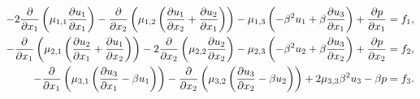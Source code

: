 \begin{align}
  - 2\frac{\partial}{\partial x_1}%
  \parent{\mu_{1,1}\frac{\partial u_1}{\partial x_1}} %
  -  \frac{\partial}{\partial x_2}%
  \parent{\mu_{1,2}\parent{\frac{\partial u_1}{\partial x_2} %
                           + \frac{\partial u_2}{\partial x_1}}} %
  - \mu_{1,3}\parent{- \beta^2 u_1 %
                     + \beta\frac{\partial u_3}{\partial x_1}} %
  + \frac{\partial p}{\partial x_1} %
  &= f_{1}, \label{eq:stokes-fourier-visc-1}\\
  - \frac{\partial }{\partial x_1}%
  \parent{\mu_{2,1}\parent{\frac{\partial u_2}{\partial x_1} %
                           + \frac{\partial u_1}{\partial x_2}}}
  - 2\frac{\partial}{\partial x_2}%
  \parent{\mu_{2,2}\frac{\partial u_2}{\partial x_2}}
  - \mu_{2,3}\parent{- \beta^2 u_2 %
                     + \beta\frac{\partial u_3}{\partial x_2}} %
  + \frac{\partial p}{\partial x_2} %
  &= f_{2}, \label{eq:stokes-fourier-visc-2}\\
  - \frac{\partial}{\partial x_1}%
  \parent{\mu_{3,1}\parent{ \frac{\partial u_3}{\partial x_1} %
                           - \beta u_1}} %
  - \frac{\partial }{\partial x_2}%
  \parent{\mu_{3,2}\parent{ \frac{\partial u_3}{\partial x_2} %
                           - \beta u_2}} %
  + 2\mu_{3,3}\beta^2u_3 %
  - \beta p %
  &= f_{3}. \label{eq:stokes-fourier-visc-3}
\end{align}

